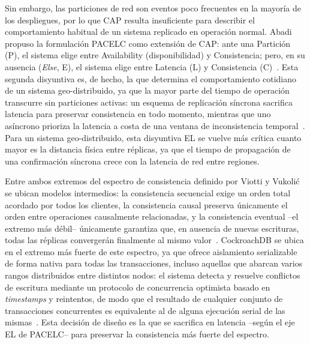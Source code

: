 \documentclass[11pt,a4paper]{article}
\begin{document}
Sin embargo, las particiones de red son eventos poco frecuentes en la
mayor\'ia de los despliegues, por lo que CAP resulta insuficiente para
describir el comportamiento habitual de un sistema replicado en operaci\'on
normal. Abadi propuso la formulaci\'on PACELC como extensi\'on de CAP: ante
una Partici\'on (P), el sistema elige entre Availability (disponibilidad) y
Consistencia; pero, en su ausencia (\emph{Else}, E), el sistema elige entre
Latencia (L) y Consistencia (C)~\cite{abadi2012,ahmed2023}. Esta segunda disyuntiva es,
de hecho, la que determina el comportamiento cotidiano de un sistema
geo-distribuido, ya que la mayor parte del tiempo de operaci\'on transcurre
sin particiones activas: un esquema de replicaci\'on s\'incrona sacrifica
latencia para preservar consistencia en todo momento, mientras que uno
as\'incrono prioriza la latencia a costa de una ventana de inconsistencia
temporal~\cite{abadi2012,ahmed2023}. Para un sistema geo-distribuido, esta
disyuntiva EL se vuelve m\'as cr\'itica cuanto mayor es la distancia f\'isica
entre r\'eplicas, ya que el tiempo de propagaci\'on de una confirmaci\'on
s\'incrona crece con la latencia de red entre regiones.

Entre ambos extremos del espectro de consistencia definido por Viotti y
Vukoli\'c se ubican modelos intermedios: la consistencia secuencial exige un
orden total acordado por todos los clientes, la consistencia causal preserva
\'unicamente el orden entre operaciones causalmente relacionadas, y la
consistencia eventual --el extremo m\'as d\'ebil-- \'unicamente garantiza que,
en ausencia de nuevas escrituras, todas las r\'eplicas converger\'an
finalmente al mismo valor~\cite{viotti2016,kleppmann2017}. CockroachDB se ubica en el
extremo m\'as fuerte de este espectro, ya que ofrece aislamiento
serializable de forma nativa para todas las transacciones, incluso aquellas
que abarcan varios rangos distribuidos entre distintos nodos: el sistema
detecta y resuelve conflictos de escritura mediante un protocolo de
concurrencia optimista basado en \emph{timestamps} y reintentos, de modo que
el resultado de cualquier conjunto de transacciones concurrentes es
equivalente al de alguna ejecuci\'on serial de las mismas~\cite{taft2020,ozsu2020}.
Esta decisi\'on de dise\~no es la que se sacrifica en latencia --seg\'un el
eje EL de PACELC-- para preservar la consistencia m\'as fuerte del espectro.
\end{document}
